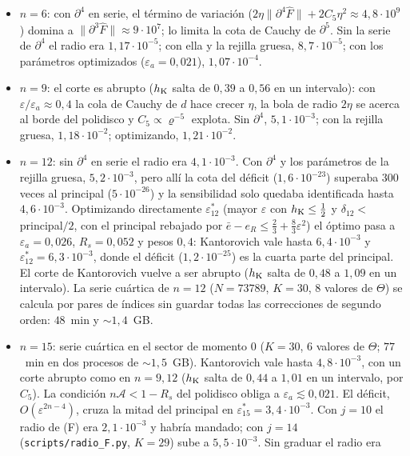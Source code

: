 \documentclass[11pt,a4paper]{article}
\theoremstyle{definition}
\theoremstyle{remark}
\newcommand{\eps}{\varepsilon}
\newcommand{\scr}[1]{\texttt{scripts/#1}}
\begin{document}
\begin{itemize}
\item $n=6$: con $\partial^4$ en serie, el término de variación ($2\eta\|\partial^4\hat F\|+2C_5\eta^2\approx
  4{,}8\cdot10^{9}$) domina a $\|\partial^3\hat F\|\approx9\cdot10^7$; lo limita la cota de Cauchy de
  $\partial^5$. Sin la serie de $\partial^4$ el radio era $1{,}17\cdot10^{-5}$; con ella y la rejilla gruesa,
  $8{,}7\cdot10^{-5}$; con los parámetros optimizados ($\eps_a=0{,}021$), $1{,}07\cdot10^{-4}$.
\item $n=9$: el corte es abrupto ($h_{\rm K}$ salta de $0{,}39$ a $0{,}56$ en un intervalo): con
  $\eps/\eps_a\approx0{,}4$ la cola de Cauchy de $d$ hace crecer $\eta$, la bola de radio $2\eta$ se
  acerca al borde del polidisco y $C_5\propto\varrho^{-5}$ explota. Sin $\partial^4$, $5{,}1\cdot10^{-3}$; con la rejilla gruesa, $1{,}18\cdot10^{-2}$; optimizando, $1{,}21\cdot10^{-2}$.
\item $n=12$: sin $\partial^4$ en serie el radio era $4{,}1\cdot10^{-3}$. Con $\partial^4$ y los parámetros de
  la rejilla gruesa, $5{,}2\cdot10^{-3}$, pero allí la cota del déficit ($1{,}6\cdot10^{-23}$) superaba
  $300$ veces al principal ($5\cdot10^{-26}$) y la sensibilidad solo quedaba identificada hasta
  $4{,}6\cdot10^{-3}$. Optimizando directamente $\eps_{12}^*$ (mayor $\eps$ con $h_{\rm K}\le\frac12$ y
  $\delta_{12}<$ principal$/2$, con el principal rebajado por $\bar e-e_R\le\frac23+\frac83\eps^2$) el óptimo
  pasa a $\eps_a=0{,}026$, $R_s=0{,}052$ y pesos $0{,}4$: Kantorovich vale hasta $6{,}4\cdot10^{-3}$ y
  $\eps_{12}^*=6{,}3\cdot10^{-3}$, donde el déficit ($1{,}2\cdot10^{-25}$) es la cuarta parte del principal.
  El corte de Kantorovich vuelve a ser abrupto ($h_{\rm K}$ salta de $0{,}48$ a $1{,}09$ en un intervalo). La serie cuártica de $n=12$ ($N=73789$, $K=30$, $8$ valores de $\Theta$) se
  calcula por pares de índices sin guardar todas las correcciones de segundo orden: $48$~min y
  $\sim1{,}4$~GB.
\item $n=15$: serie cuártica en el sector de momento $0$ ($K=30$, $6$ valores de $\Theta$; $77$~min en dos
  procesos de $\sim1{,}5$~GB). Kantorovich vale hasta $4{,}8\cdot10^{-3}$, con un corte abrupto como en
  $n=9,12$ ($h_{\rm K}$ salta de $0{,}44$ a $1{,}01$ en un intervalo, por $C_5$). La condición
  $n\mathcal A<1-R_s$ del polidisco obliga a $\eps_a\lesssim0{,}021$. El déficit, $O(\eps^{2n-4})$, cruza la
  mitad del principal en $\eps_{15}^*=3{,}4\cdot10^{-3}$. Con $j=10$ el radio de (F) era $2{,}1\cdot10^{-3}$ y
  habría mandado; con $j=14$ (\scr{radio\_F.py}, $K=29$) sube a $5{,}5\cdot10^{-3}$. Sin graduar el radio era

\end{itemize}
\end{document}
